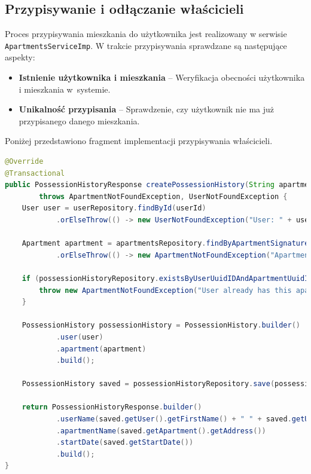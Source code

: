 \subsection{Przypisywanie i odłączanie właścicieli}

Proces przypisywania mieszkania do użytkownika jest realizowany w serwisie \texttt{ApartmentsServiceImp}. W trakcie przypisywania sprawdzane są następujące aspekty:
\begin{itemize}
    \item \textbf{Istnienie użytkownika i mieszkania} -- Weryfikacja obecności użytkownika i mieszkania w~systemie.
    \item \textbf{Unikalność przypisania} -- Sprawdzenie, czy użytkownik nie ma już przypisanego danego mieszkania.
\end{itemize}

\noindent Poniżej przedstawiono fragment implementacji przypisywania właścicieli.

\begin{lstlisting}[language=Java, style=JavaStyle, caption=Przypisywanie właścicieli w \texttt{ApartmentsServiceImp}]
@Override
@Transactional
public PossessionHistoryResponse createPossessionHistory(String apartmentSignature, UUID userId)
        throws ApartmentNotFoundException, UserNotFoundException {
    User user = userRepository.findById(userId)
            .orElseThrow(() -> new UserNotFoundException("User: " + userId + " not found"));

    Apartment apartment = apartmentsRepository.findByApartmentSignature(apartmentSignature)
            .orElseThrow(() -> new ApartmentNotFoundException("Apartment with signature: " + apartmentSignature + " not found"));

    if (possessionHistoryRepository.existsByUserUuidIDAndApartmentUuidID(userId, apartment.getUuidID())) {
        throw new ApartmentNotFoundException("User already has this apartment assigned");
    }

    PossessionHistory possessionHistory = PossessionHistory.builder()
            .user(user)
            .apartment(apartment)
            .build();

    PossessionHistory saved = possessionHistoryRepository.save(possessionHistory);

    return PossessionHistoryResponse.builder()
            .userName(saved.getUser().getFirstName() + " " + saved.getUser().getLastName())
            .apartmentName(saved.getApartment().getAddress())
            .startDate(saved.getStartDate())
            .build();
}
\end{lstlisting}

